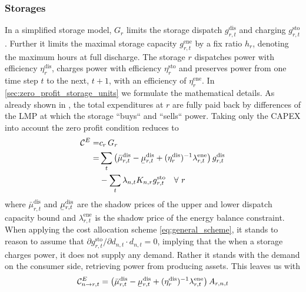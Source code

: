 \documentclass[11pt,twocolumn]{article}
\newcommand{\ubar}[1]{\underaccent{\bar}{#1}}
\newcommand{\Forall}[1]{\hspace{10pt} \forall \,\, #1 }
\newcommand{\storage}{g_{r,t}}
\newcommand{\storagedispatch}{\storage^\text{dis}}
\newcommand{\storagecharge}{\storage^\text{sto}}
\newcommand{\storagesoc}{\storage^\text{ene}}
\newcommand{\efficiency}{\eta_{r}}
\newcommand{\efficiencydispatch}{\efficiency^\text{dis}}
\newcommand{\efficiencycharge}{\efficiency^\text{sto}}
\newcommand{\efficiencysoc}{\efficiency^\text{ene}}
\newcommand{\capitalpricestorage}{c_r}
\newcommand{\capacitystorage}{G_r}
\newcommand{\mulowerstoragedispatch}{\ubar{\mu}_{r,t}^\text{dis}}
\newcommand{\muupperstoragedispatch}{\bar{\mu}_{r,t}^\text{dis}}
\newcommand{\muupperstoragecharge}{\bar{\mu}_{r,t}^\text{sto}}
\newcommand{\muupperstoragesoc}{\bar{\mu}_{r,t}^\text{ene}}
\newcommand{\mustateofcharge}{\lambda^\text{ene}_{r,t}}
\newcommand{\lmp}[1][n]{\lambda_{#1,t}}
\newcommand{\demand}[1][n]{d_{#1,t}}
\newcommand{\incidencestorage}[1][n]{K_{#1,r}}
\newcommand{\capexstorage}{\mathcal{C}^E}
\newcommand{\allocatestoragedispatch}[1][r, n]{A_{#1,t}}
\newcommand{\allocatecapexstorage}[1][n \rightarrow r]{\capexstorage_{#1,t}}
\begin{document}
\subsubsection{Storages}
\label{sec:storages}


In a simplified storage model, $\capacitystorage$ limits the storage dispatch $\storagedispatch$ and charging $\storagecharge$. Further it limits the maximal storage capacity $\storagesoc$ by a fix ratio $h_r$, denoting the maximum hours at full discharge. The storage $r$ dispatches power with efficiency $\efficiencydispatch$, charges power with efficiency $\efficiencycharge$ and preserves power from one time step $t$ to the next, $t+1$, with an efficiency of $\efficiencysoc$. In \cref{sec:zero_profit_storage_units} we formulate the mathematical details. As already shown in \cite{brown_decreasing_2020}, the total expenditures at $r$ are fully paid back by differences of the LMP at which the storage ``buys`` and ``sells`` power. Taking only the CAPEX into account the zero profit condition reduces to
\begin{align}
    \notag
    \capexstorage =& \capitalpricestorage \, \capacitystorage \\
    \notag
    =& \sum_t \left(\muupperstoragedispatch - \mulowerstoragedispatch  + (\efficiencydispatch )^{-1} \mustateofcharge \right) \storagedispatch \\
    &- \sum_t \lmp \incidencestorage  \storagecharge \Forall{r} 
    \label{eq:no_profit_capex_storage}
\end{align}
where $\muupperstoragedispatch$ and $\mulowerstoragedispatch$ are the shadow prices of the upper and lower dispatch capacity bound and $\mustateofcharge$ is the shadow price of the energy balance constraint. When applying the cost allocation scheme \cref{eq:general_scheme}, it stands to reason to assume that $\partial \storagecharge / \partial \demand \cdot \demand = 0$, implying that the when a storage charges power, it does not supply any demand. Rather it stands with the demand on the consumer side, retrieving power from producing assets. 
This leaves us with 
\begin{align}
     \allocatecapexstorage = \left(\muupperstoragedispatch - \mulowerstoragedispatch  + (\efficiencydispatch )^{-1} \mustateofcharge \right) \allocatestoragedispatch
\end{align}
\end{document}
